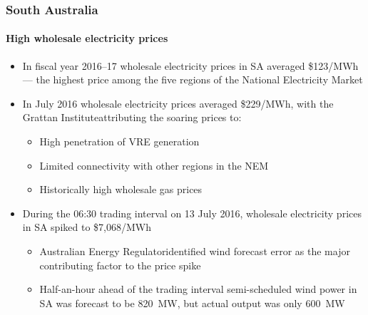 \documentclass[presentation, smaller, table, svgnames]{beamer}
\begin{document}
\begin{frame}
	\frametitle{South Australia}
	\framesubtitle{High wholesale electricity prices}

	\begin{itemize}
		\item  In fiscal year 2016--17 wholesale electricity prices in SA averaged \$123/MWh --- the highest price among the five regions of the National Electricity Market
		
		\item  In July 2016 wholesale electricity prices averaged \$229/MWh, with the Grattan Institute\footnotemark[2] attributing the soaring prices to:
		\begin{itemize}
			\item  High penetration of VRE generation
			\item  Limited connectivity with other regions in the NEM
			\item  Historically high wholesale gas prices
		\end{itemize}
		
		\item  During the 06:30 trading interval on 13 July 2016, wholesale electricity prices in SA spiked to \$7,068/MWh
		\begin{itemize}
			\item  Australian Energy Regulator\footnotemark[3] identified wind forecast error as the major contributing factor to the price spike
			\item  Half-an-hour ahead of the trading interval semi-scheduled wind power in SA was forecast to be 820~MW, but actual output was only 600~MW
		\end{itemize}
		
	\end{itemize}

\footnotesize{
\par
}

\end{frame}
\end{document}
